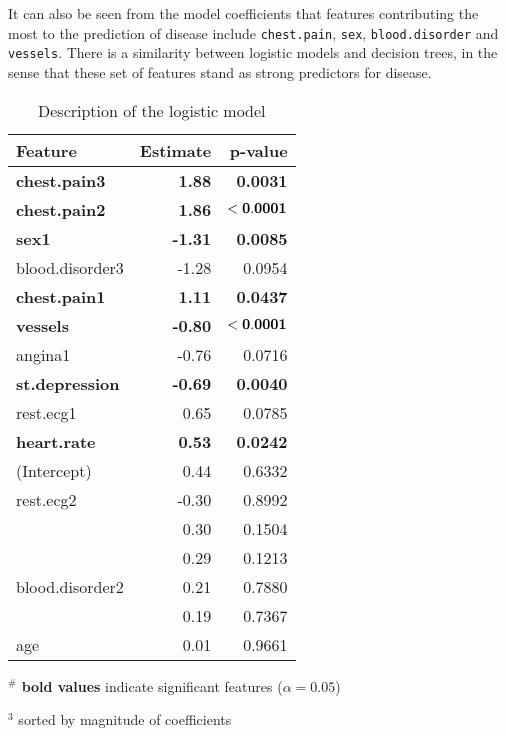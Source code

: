    

It can also be seen from the model coefficients that features contributing the most to the prediction of disease include \texttt{chest.pain}, \texttt{sex}, \texttt{blood.disorder} and \texttt{vessels}. There is a similarity between logistic models and decision trees, in the sense that these set of features stand as strong predictors for disease.

\begin{table}[h]
    \centering
    \begin{tabular}{lrr}
        \toprule
        \textbf{Feature} & \textbf{Estimate\footnotemark{}} & \textbf{p-value}\\
        \midrule
        \bf chest.pain3 & \bf 1.88 & \bf 0.0031\\
        \midrule
        \bf chest.pain2 & \bf 1.86 & \( \bf <  0.0001 \) \\
        \midrule
        \bf sex1 & \bf -1.31 & \bf 0.0085\\
        \midrule
        blood.disorder3 & -1.28 & 0.0954\\
        \midrule
        \bf chest.pain1 & \bf 1.11 & \bf 0.0437\\
        \midrule
        \bf vessels & \bf -0.80 & \( \bf < 0.0001 \)\\
        \midrule
        angina1 & -0.76 & 0.0716\\
        \midrule
        \bf st.depression & \bf -0.69 & \bf 0.0040\\
        \midrule
        rest.ecg1 & 0.65 & 0.0785\\
        \midrule
        \bf heart.rate & \bf 0.53 & \bf 0.0242\\
        \midrule
        (Intercept) & 0.44 & 0.6332\\
        \midrule
        rest.ecg2 & -0.30 & 0.8992\\
        \midrule
        \color{red}{chol} & 0.30 & 0.1504\\
        \midrule
        \color{red}{bp} & 0.29 & 0.1213\\
        \midrule
        blood.disorder2 & 0.21 & 0.7880\\
        \midrule
        \color{red}{fbs1} & 0.19 & 0.7367\\
        \midrule
        age & 0.01 & 0.9661\\
        \bottomrule
    \end{tabular}

    \raggedright
    \( ^\# \) {\small \textbf{bold values} indicate significant features (\( \alpha = 0.05 \))}
    
    \( ^3 \) {\small sorted by magnitude of coefficients}

    \centering
    \vspace{4pt}
    \caption{Description of the logistic model}
\end{table}

